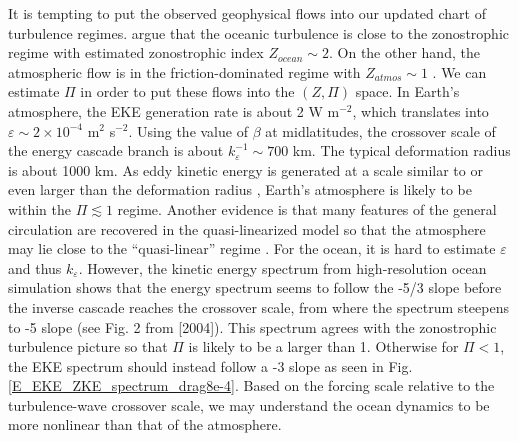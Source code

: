 \documentclass{ametsoc}
\begin{document}
It is tempting to put the observed geophysical flows into our updated
chart of turbulence regimes. \citet{Galperin2004} argue that the
oceanic turbulence is close to the zonostrophic regime with estimated
zonostrophic index $Z_{ocean}\sim2$. On the other hand, the atmospheric
flow is in the friction-dominated regime with $Z_{atmos}\sim1$ \citep{Galperin2010}.
We can estimate $\Pi$ in order to put these flows into the $(Z,\Pi)$
space. In Earth's atmosphere, the EKE generation rate is about
2 W m$^{-2}$, which translates into $\varepsilon\sim2\times10^{-4}$
m$^{2}$ s$^{-2}$. Using the value of $\beta$ at midlatitudes, the
crossover scale of the energy cascade branch is about $k_{\varepsilon}^{-1}\sim700$
km. The typical deformation radius is about 1000 km. As eddy kinetic
energy is generated at a scale similar to or even larger than the deformation
radius \citep{Chai2014}, Earth's atmosphere is likely to be within
the $\Pi\apprle1$ regime. Another evidence is that many features
of the general circulation are recovered in the quasi-linearized model
so that the atmosphere may lie close to the ``quasi-linear'' regime
\citep{O'Gorman2007}. For the ocean, it is hard to estimate $\varepsilon$
and thus $k_{\varepsilon}$. However, the kinetic energy spectrum
from high-resolution ocean simulation shows that the energy spectrum
seems to follow the -5/3 slope before the inverse cascade reaches
the crossover scale, from where the spectrum steepens to -5 slope
(see Fig. 2 from \citeauthor{Galperin2004} {[}2004{]}). This spectrum
agrees with the zonostrophic turbulence picture so that $\Pi$ is likely to
be a larger than 1. Otherwise for $\Pi<1$, the EKE spectrum should
instead follow a -3 slope as seen in Fig. \ref{E_EKE_ZKE_spectrum_drag8e-4}.
Based on the forcing scale relative to the turbulence-wave crossover
scale, we may understand the ocean dynamics to be more nonlinear than
that of the atmosphere. 


 
 
\end{document}
